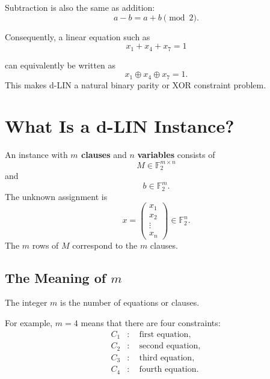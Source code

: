 \documentclass[11pt,a4paper]{article}
\newcommand{\F}{\mathbb{F}}
\begin{document}
Subtraction is also the same as addition:\begin{equation}
    a-b = a+b \pmod 2.
\end{equation}

Consequently, a linear equation such as\begin{equation}
    x_1+x_4+x_7 = 1
\end{equation}

can equivalently be written as\begin{equation}
    x_1\oplus x_4\oplus x_7 = 1.
\end{equation}
This makes d-LIN a natural binary parity or XOR constraint problem.

\section{What Is a d-LIN Instance?}
An instance with \textbf{$m$ clauses} and $n$ \textbf{variables} consists of\begin{equation}
    M\in\F_2^{m\times n}
\end{equation}
and
\begin{equation}
    b\in\F_2^m.
\end{equation}
The unknown assignment is
\begin{equation}
    x=
    \begin{pmatrix}
    x_1\\
    x_2\\
    \vdots\\
    x_n
    \end{pmatrix}
    \in\F_2^n.
\end{equation}
The $m$ rows of $M$ correspond to the $m$ clauses.



\subsection{The Meaning of \texorpdfstring{$m$}{m}}
The integer $m$ is the number of equations or clauses.

For example, $m=4$ means that there are four constraints:\begin{align}
C_1 &: \quad \text{first equation},\\
C_2 &: \quad \text{second equation},\\
C_3 &: \quad \text{third equation},\\
C_4 &: \quad \text{fourth equation}.
\end{align}
\end{document}
